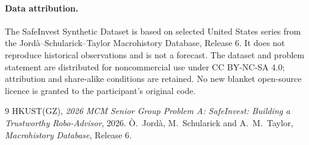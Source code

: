 \documentclass[11pt,a4paper]{article}
\begin{document}
\paragraph{Data attribution.}
The SafeInvest Synthetic Dataset is based on selected United States series from
the Jordà--Schularick--Taylor Macrohistory Database, Release 6. It does not
reproduce historical observations and is not a forecast. The dataset and problem
statement are distributed for noncommercial use under CC BY-NC-SA 4.0; attribution
and share-alike conditions are retained. No new blanket open-source licence is
granted to the participant's original code.

\begin{thebibliography}{9}
\setlength{\itemsep}{1pt}
HKUST(GZ), \emph{2026 MCM Senior Group Problem A: SafeInvest: Building a
Trustworthy Robo-Advisor}, 2026.
Ò.~Jordà, M.~Schularick and A.~M.~Taylor, \emph{Macrohistory Database},
Release 6.
\end{thebibliography}
\end{document}
